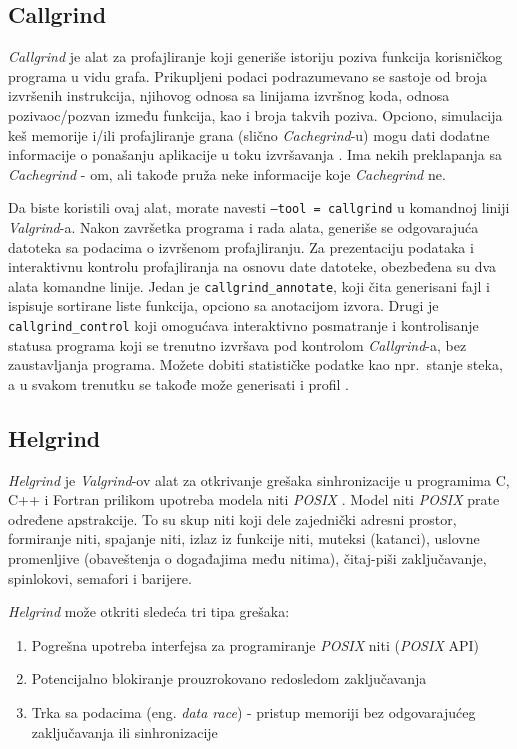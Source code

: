 \documentclass[12pt,oneside]{memoir}
\theoremstyle{plain}
\theoremstyle{definition}
\begin{document}
\subsection{Callgrind}

\textit{Callgrind} je alat za profajliranje koji generiše istoriju poziva funkcija korisničkog programa u vidu grafa. Prikupljeni podaci podrazumevano se sastoje od broja izvršenih instrukcija, njihovog odnosa sa linijama izvršnog koda, odnosa pozivaoc/pozvan između funkcija, kao i broja takvih poziva. Opciono, simulacija keš memorije i/ili profajliranje grana (slično \textit{Cachegrind}-u) mogu dati dodatne informacije o ponašanju aplikacije u toku izvršavanja \cite{Callgrind}. Ima nekih preklapanja sa \textit{Cachegrind} - om, ali takođe pruža neke informacije koje \textit{Cachegrind} ne.

Da biste koristili ovaj alat, morate navesti \texttt{--tool = callgrind} u komandnoj liniji \textit{Valgrind}-a. Nakon završetka programa i rada alata, generiše se odgovarajuća datoteka sa podacima o izvršenom profajliranju. Za prezentaciju podataka i interaktivnu kontrolu profajliranja na osnovu date datoteke, obezbeđena su dva alata komandne linije. Jedan je \texttt{callgrind\_annotate}, koji čita generisani fajl i ispisuje sortirane liste funkcija, opciono sa anotacijom izvora. Drugi je \texttt{callgrind\_control} koji omogućava interaktivno posmatranje i kontrolisanje statusa programa koji se trenutno izvršava pod kontrolom \textit{Callgrind}-a, bez zaustavljanja programa. Možete dobiti statističke podatke kao npr.~stanje steka, a u svakom trenutku se takođe može generisati i profil \cite{Callgrind}. 

\subsection{Helgrind}

\textit{Helgrind} je \textit{Valgrind}-ov alat za otkrivanje grešaka sinhronizacije u programima C, C++ i Fortran prilikom upotreba modela niti \textit{POSIX} \cite{Helgrind}. Model niti \textit{POSIX} prate određene apstrakcije. To su skup niti koji dele zajednički adresni prostor, formiranje niti, spajanje niti, izlaz iz funkcije niti, muteksi (katanci), uslovne promenljive (obaveštenja o događajima među nitima), čitaj-piši zaključavanje, spinlokovi, semafori i barijere. 

\textit{Helgrind} može otkriti sledeća tri tipa grešaka:
\begin{enumerate}
\item Pogrešna upotreba interfejsa za programiranje \textit{POSIX} niti (\textit{POSIX} API) 
\item Potencijalno blokiranje prouzrokovano redosledom zaključavanja
\item Trka sa podacima (eng. \textit{data race})  - pristup memoriji bez odgovarajućeg zaključavanja ili sinhronizacije
\end{enumerate}
\end{document}
